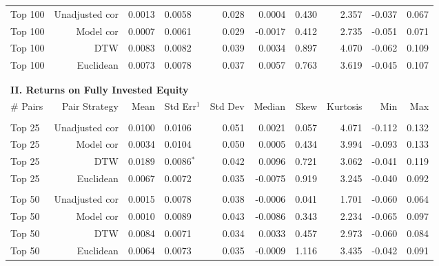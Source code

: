 \documentclass[12pt]{article}
\begin{document}
\begin{table}[hp]
\begin{tabular}{l r r l r r r r r r}
        Top 100   & Unadjusted cor &  0.0013 & 0.0058          & 0.028 &  0.0004 &  0.430 & 2.357 & -0.037 & 0.067 \\
        Top 100   & Model cor      &  0.0007 & 0.0061          & 0.029 & -0.0017 &  0.412 & 2.735 & -0.051 & 0.071 \\
        Top 100   & DTW            &  0.0083 & 0.0082          & 0.039 &  0.0034 &  0.897 & 4.070 & -0.062 & 0.109 \\
        Top 100   & Euclidean      &  0.0073 & 0.0078          & 0.037 &  0.0057 &  0.763 & 3.619 & -0.045 & 0.107 \\
        \vspace{-1mm} \\
        \hline
        \vspace{1 mm} \\
        \multicolumn{9}{l}{\textbf{II. Returns on Fully Invested Equity}} \\
        \# Pairs  & Pair Strategy & Mean & Std Err{$^{1}$} & Std Dev & Median & Skew & Kurtosis & Min & Max \\
        \hline
        \vspace{-1mm} \\
        Top 25    & Unadjusted cor &  0.0100 & 0.0106          & 0.051 &  0.0021 &  0.057 & 4.071 & -0.112 & 0.132 \\
        Top 25    & Model cor      &  0.0034 & 0.0104          & 0.050 &  0.0005 &  0.434 & 3.994 & -0.093 & 0.133 \\
        Top 25    & DTW            &  0.0189 & 0.0086{$^{*}$}  & 0.042 &  0.0096 &  0.721 & 3.062 & -0.041 & 0.119 \\
        Top 25    & Euclidean      &  0.0067 & 0.0072          & 0.035 & -0.0075 &  0.919 & 3.245 & -0.040 & 0.092 \\
        \vspace{-1mm} \\
        Top 50    & Unadjusted cor &  0.0015 & 0.0078          & 0.038 & -0.0006 &  0.041 & 1.701 & -0.060 & 0.064 \\
        Top 50    & Model cor      &  0.0010 & 0.0089          & 0.043 & -0.0086 &  0.343 & 2.234 & -0.065 & 0.097 \\
        Top 50    & DTW            &  0.0084 & 0.0071          & 0.034 &  0.0033 &  0.457 & 2.973 & -0.060 & 0.084 \\
        Top 50    & Euclidean      &  0.0064 & 0.0073          & 0.035 & -0.0009 &  1.116 & 3.435 & -0.042 & 0.091 \\

\end{tabular}
\end{table}
\end{document}
